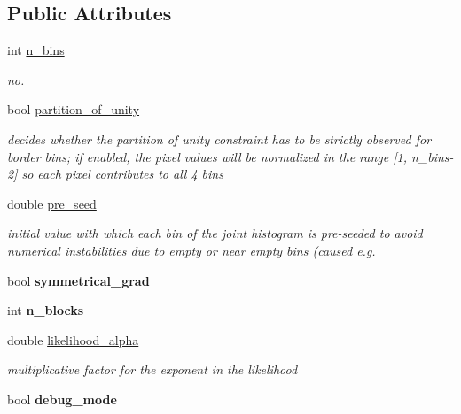 \subsection*{Public Attributes}
\begin{DoxyCompactItemize}
\item 
int \hyperlink{structCCREParams_afeb767eb97c56f06a0b1953a741fffa2}{n\-\_\-bins}
\begin{DoxyCompactList}\small\item\em no. \end{DoxyCompactList}\item 
\hypertarget{structCCREParams_a2846c0b115646bfe8dd61c8d43d2ee48}{bool \hyperlink{structCCREParams_a2846c0b115646bfe8dd61c8d43d2ee48}{partition\-\_\-of\-\_\-unity}}\label{structCCREParams_a2846c0b115646bfe8dd61c8d43d2ee48}

\begin{DoxyCompactList}\small\item\em decides whether the partition of unity constraint has to be strictly observed for border bins; if enabled, the pixel values will be normalized in the range \mbox{[}1, n\-\_\-bins-\/2\mbox{]} so each pixel contributes to all 4 bins \end{DoxyCompactList}\item 
double \hyperlink{structCCREParams_a17d4136ef6a1c8aae61b286531b75846}{pre\-\_\-seed}
\begin{DoxyCompactList}\small\item\em initial value with which each bin of the joint histogram is pre-\/seeded to avoid numerical instabilities due to empty or near empty bins (caused e.\-g. \end{DoxyCompactList}\item 
\hypertarget{structCCREParams_aafc4719ffd925e6db983d00f126a73f3}{bool {\bfseries symmetrical\-\_\-grad}}\label{structCCREParams_aafc4719ffd925e6db983d00f126a73f3}

\item 
\hypertarget{structCCREParams_af46b2bb4108e66d03f508cdc110603fe}{int {\bfseries n\-\_\-blocks}}\label{structCCREParams_af46b2bb4108e66d03f508cdc110603fe}

\item 
\hypertarget{structCCREParams_a554cb54ca0c4c707476e70d5c4a0f7d5}{double \hyperlink{structCCREParams_a554cb54ca0c4c707476e70d5c4a0f7d5}{likelihood\-\_\-alpha}}\label{structCCREParams_a554cb54ca0c4c707476e70d5c4a0f7d5}

\begin{DoxyCompactList}\small\item\em multiplicative factor for the exponent in the likelihood \end{DoxyCompactList}\item 
\hypertarget{structCCREParams_af07878bd091d642e47655e87f6650e1b}{bool {\bfseries debug\-\_\-mode}}\label{structCCREParams_af07878bd091d642e47655e87f6650e1b}

\end{DoxyCompactItemize}


